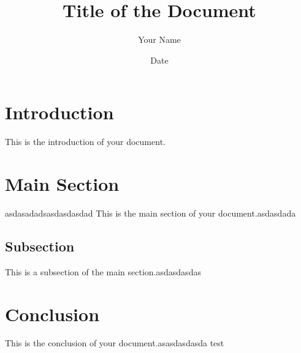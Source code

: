 \documentclass{article}
\begin{document}
\title{Title of the Document}
\author{Your Name}
\date{Date}

\maketitle

\section{Introduction}

This is the introduction of your document.

\section{Main Section}
asdasadadsasdasdasdad
This is the main section of your document.asdasdada

\subsection{Subsection}

This is a subsection of the main section.asdasdasdas



\section{Conclusion}

This is the conclusion of your document.asasdasdasda
test
\end{document}
